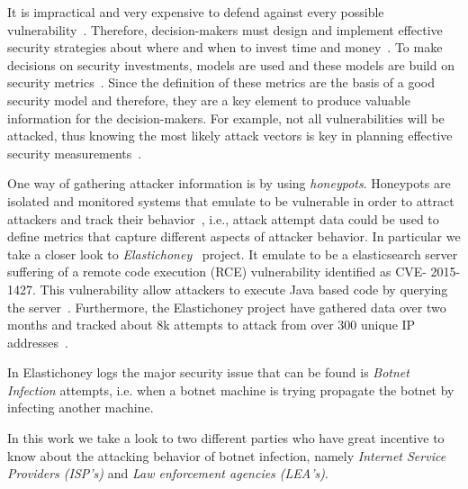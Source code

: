 \label{cap:sec1}

It is impractical and very expensive to defend against every possible vulnerability~\cite{TARA}. Therefore, decision-makers must design and implement effective security strategies about where and when to invest time and money~\cite{ROSI}. To make decisions on security investments, models are used and these models are build on security metrics~\cite{BR2010}. Since the definition of these metrics are the basis of a good security model and therefore, they are a key element to produce valuable information for the decision-makers. For example, not all vulnerabilities will be attacked, thus knowing the most likely attack vectors is key in planning effective security measurements~\cite{TARA}.


One way of gathering attacker information is by using \textit{honeypots}. Honeypots are isolated and monitored systems that emulate to be vulnerable in order to attract attackers and track their behavior~\cite{WP2010}, i.e., attack attempt data could be used to define metrics that capture different aspects of attacker behavior. In particular we take a closer look to \textit{Elastichoney}~\cite{BR2010} project. It emulate to be a elasticsearch server suffering of a remote code execution (RCE) vulnerability identified as CVE- 2015-1427. This vulnerability allow attackers to execute Java based code by querying the server~\cite{CVE}. Furthermore, the Elastichoney project have gathered data over two months and tracked about 8k attempts to attack from over 300 unique IP addresses~\cite{BR2010}.

In Elastichoney logs the major security issue that can be found is \textit{Botnet Infection} attempts, i.e. when a botnet machine is trying propagate the botnet by infecting another machine.

In this work we take a look to two different parties who have great incentive to know about the attacking behavior of botnet infection, namely \textit{Internet Service Providers (ISP's)} and \textit{Law enforcement agencies (LEA's)}.

